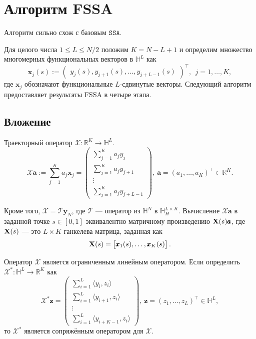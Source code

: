 \documentclass[12pt, specialist, subf
]{disser}
\theoremstyle{definition}
\newcommand{\SSA}{\texttt{SSA}}
\begin{document}
\section{Алгоритм FSSA}
Алгоритм сильно схож с базовым $\SSA$.

Для целого числа $1\leq L\leq{N}/{2}$ положим $K=N-L+1$ и определим множество многомерных функциональных векторов в $\mathbb{H}^L$ как
\begin{equation}\label{flvec}
	{\pmb x}_j(s):= \begin{pmatrix} y_j(s), y_{j+1}(s), \ldots, y_{j+L-1}(s)\end{pmatrix}^\top,\ \ j=1,\ldots, K,
\end{equation}
где ${\pmb x}_j$ обозначают функциональные $L$-сдвинутые векторы. Следующий алгоритм предоставляет результаты FSSA в четыре этапа.

\subsection*{Вложение}
Траекторный оператор $\mathcal{X}:\mathbb{R}^K \rightarrow \mathbb{H}^L$.
\begin{equation}
	\label{eq:traj}
	\mathcal{X}{\pmb a}:=\sum_{j=1}^K a_j{\pmb x}_j=
	\begin{pmatrix} \sum_{j=1}^K a_jy_j\\ \sum_{j=1}^K a_j y_{j+1}\\ \vdots\\ \sum_{j=1}^K a_j y_{j+L-1} \end{pmatrix},
	\ {\pmb a}=\left(a_1,\ldots, a_K\right)^\top \in\mathbb{R}^K.
\end{equation}

Кроме того, $\mathcal{X}=\mathcal{T}\textbf{y}_N$, где $\mathcal{T}$ — оператор из $\mathbb{H}^N$ в $\mathbb{H}_H^{L\times K}$. Вычисление $\mathcal{X} \pmb{a}$ в заданной точке $s\in [0,1]$ эквивалентно матричному произведению ${\bf X}(s)\pmb{a}$, где ${\bf X}(s)$ — это $L \times K$ ганкелева матрица, заданная как
\begin{equation}\label{ftraj}
	{\bf X}(s)=\begin{bmatrix} {\pmb x}_1(s), \ldots, {\pmb x}_K(s) \end{bmatrix}.
\end{equation}


Оператор $\mathcal{X}$ является ограниченным линейным оператором. Если определить $\mathcal{X}^*:\mathbb{H}^L \rightarrow \mathbb{R}^K$ как
\begin{equation}
	\mathcal{X}^*{\pmb z}=
	\begin{pmatrix} \sum_{i=1}^L \langle y_i, z_i\rangle\\ \sum_{i=1}^L \langle y_{i+1}, z_i\rangle\\ \vdots\\ \sum_{i=1}^L \langle y_{i+K-1}, z_i\rangle \end{pmatrix},
	\ {\pmb z}=\left(z_1,\ldots, z_L\right)^\top\in\mathbb{H}^L,
\end{equation}
то $\mathcal{X}^*$ является сопряжённым оператором для $\mathcal{X}$.
\end{document}
